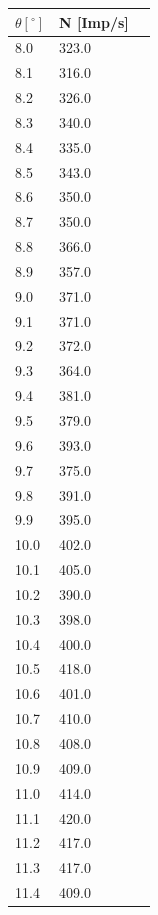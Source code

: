 \begin{minipage}{\linewidth}
    \begin{table}[H]
        \centering
    \begin{tabular}{lll}
        \toprule
        $\theta [^\circ]$ & N [Imp/s] \\
        \midrule
        8.0		& 323.0 \\
        8.1		& 316.0 \\
        8.2		& 326.0 \\
        8.3		& 340.0 \\
        8.4		& 335.0 \\
        8.5		& 343.0 \\
        8.6		& 350.0 \\
        8.7		& 350.0 \\
        8.8		& 366.0 \\
        8.9		& 357.0 \\
        9.0		& 371.0 \\
        9.1		& 371.0 \\
        9.2		& 372.0 \\
        9.3		& 364.0 \\
        9.4		& 381.0 \\
        9.5		& 379.0 \\
        9.6		& 393.0 \\
        9.7		& 375.0 \\
        9.8		& 391.0 \\
        9.9		& 395.0 \\
        10.0	& 402.0 \\
        10.1	& 405.0 \\
        10.2	& 390.0 \\
        10.3	& 398.0 \\
        10.4	& 400.0 \\
        10.5	& 418.0 \\
        10.6	& 401.0 \\
        10.7	& 410.0 \\
        10.8	& 408.0 \\
        10.9	& 409.0 \\
        11.0	& 414.0 \\
        11.1	& 420.0 \\
        11.2	& 417.0 \\
        11.3	& 417.0 \\
        11.4	& 409.0 \\

\end{tabular}
\end{table}
\end{minipage}
